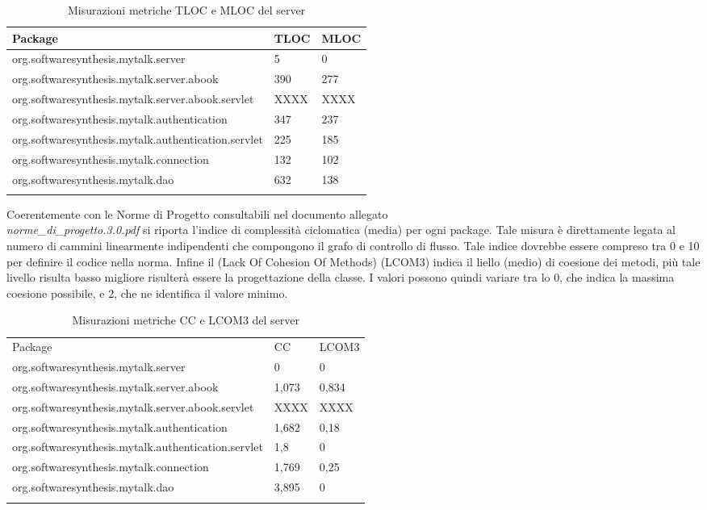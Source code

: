 \begin{center}
\begin{longtable}{p{}ll}
\toprule Package & TLOC  & MLOC\\
\midrule
org.softwaresynthesis.mytalk.server & 5 & 0\\
org.softwaresynthesis.mytalk.server.abook & 390 & 277\\
org.softwaresynthesis.mytalk.server.abook.servlet & XXXX & XXXX\\
org.softwaresynthesis.mytalk.authentication & 347 & 237\\
org.softwaresynthesis.mytalk.authentication.servlet & 225 & 185\\
org.softwaresynthesis.mytalk.connection & 132 & 102\\
org.softwaresynthesis.mytalk.dao & 632 & 138\\
\bottomrule
\caption{Misurazioni metriche TLOC e MLOC del server} \label{tab: metricheTLOCMLOCserver}
\end{longtable}
\end{center}


Coerentemente con le Norme di Progetto consultabili nel documento allegato\\ \textit{norme\_di\_progetto.3.0.pdf} si riporta l'indice di complessità ciclomatica (media) per ogni package. Tale misura è direttamente legata al numero di cammini linearmente indipendenti che compongono il grafo di controllo di flusso. Tale indice dovrebbe essere compreso tra 0 e 10 per definire il codice nella norma.
Infine il \inglese(Lack Of Cohesion Of Methods) (LCOM3) indica il liello (medio) di coesione dei metodi, più tale livello risulta basso migliore risulterà essere la progettazione della classe. I valori possono quindi variare tra lo 0, che indica la massima coesione possibile, e 2, che ne identifica il valore minimo.

\begin{center}
\begin{longtable}{p{}ll}
\toprule Package & CC  & LCOM3\\
org.softwaresynthesis.mytalk.server & 0 & 0\\
org.softwaresynthesis.mytalk.server.abook & 1,073 & 0,834\\
org.softwaresynthesis.mytalk.server.abook.servlet & XXXX & XXXX\\
org.softwaresynthesis.mytalk.authentication & 1,682 & 0,18\\
org.softwaresynthesis.mytalk.authentication.servlet & 1,8 & 0\\
org.softwaresynthesis.mytalk.connection & 1,769 & 0,25\\
org.softwaresynthesis.mytalk.dao & 3,895 & 0\\

\midrule
\bottomrule
\caption{Misurazioni metriche CC e LCOM3 del server} \label{tab: metricheCCLCOM3server}
\end{longtable}
\end{center}


